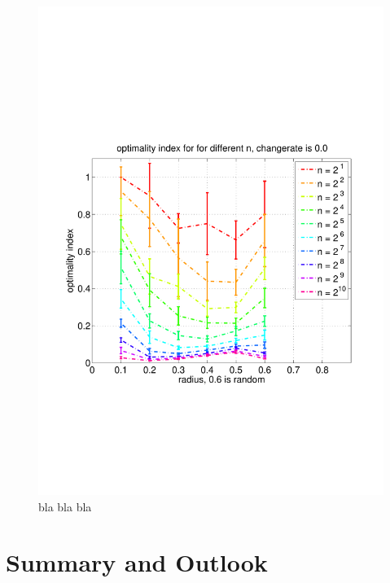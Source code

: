 \documentclass[11pt]{article}
\begin{document}
\begin{figure}[h!]
	\includegraphics[trim=0 180 0 180, clip, width=\linewidth]{../figures/figure_4}
	\caption{bla bla bla}
	\label{fig:optimality3}
\end{figure}


\section{Summary and Outlook}

\renewcommand{\refname}{\section{References}}




\end{document}
